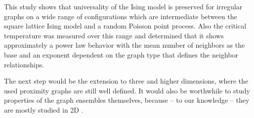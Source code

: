 \label{sec:conclusion}
This study shows that universality of the Ising model is preserved for
irregular graphs on a wide range of configurations which are intermediate
between the square lattice Ising model and a random Poisson point process.
Also the critical temperature was measured over this range and determined
that it shows approximately a power law behavior with the mean
number of neighbors as the base and an exponent dependent on the
graph type that defines the neighbor relationships.

The next step would be the extension to three and higher
dimensions, where the used proximity graphs are still well defined. It
would also be worthwhile to study properties of the graph ensembles themselves,
because -- to our knowledge -- they are mostly studied in 2D \cite{RNGCell}.
